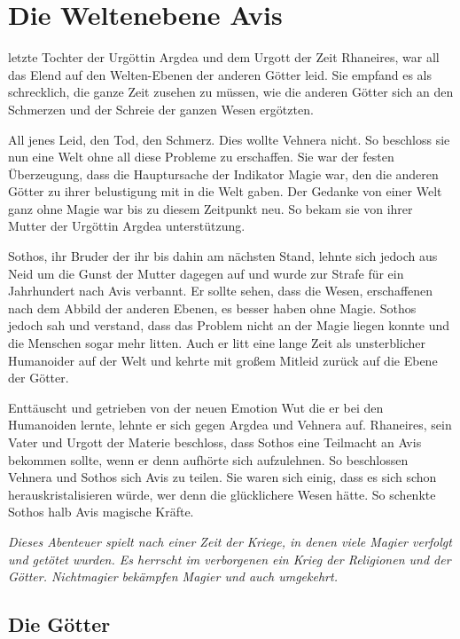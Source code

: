 \chapter{Die Weltenebene Avis}

 letzte Tochter der Urgöttin Argdea und dem Urgott der Zeit Rhaneires, war all das Elend auf den Welten-Ebenen der anderen Götter leid. Sie empfand es als schrecklich, die ganze Zeit zusehen zu müssen, wie die anderen Götter sich an den Schmerzen und der Schreie der ganzen Wesen ergötzten.

 All jenes Leid, den Tod, den Schmerz. Dies wollte Vehnera nicht. So beschloss sie nun eine Welt ohne all diese Probleme zu erschaffen. Sie war der festen Überzeugung, dass die Hauptursache der Indikator Magie war, den die anderen Götter zu ihrer belustigung mit in die Welt gaben. Der Gedanke von einer Welt ganz ohne Magie war bis zu diesem Zeitpunkt neu. So bekam sie von ihrer Mutter der Urgöttin Argdea unterstützung.

Sothos, ihr Bruder der ihr bis dahin am nächsten Stand, lehnte sich jedoch aus Neid um die Gunst der Mutter dagegen auf und wurde zur Strafe für ein Jahrhundert nach Avis verbannt. Er sollte sehen, dass die Wesen, erschaffenen nach dem Abbild der anderen Ebenen, es besser haben ohne Magie. Sothos jedoch sah und verstand, dass das Problem nicht an der Magie liegen konnte und die Menschen sogar mehr litten. Auch er litt eine lange Zeit als unsterblicher Humanoider auf der Welt und kehrte mit großem Mitleid zurück auf die Ebene der Götter.

Enttäuscht und getrieben von der neuen Emotion Wut die er bei den Humanoiden lernte, lehnte er sich gegen Argdea und Vehnera auf. Rhaneires, sein Vater und Urgott der Materie beschloss, dass Sothos eine Teilmacht an Avis bekommen sollte, wenn er denn aufhörte sich aufzulehnen. So beschlossen Vehnera und Sothos sich Avis zu teilen. Sie waren sich einig, dass es sich schon herauskristalisieren würde, wer denn die glücklichere Wesen hätte. So schenkte Sothos halb Avis magische Kräfte.

\textit{Dieses Abenteuer spielt nach einer Zeit der Kriege, in denen viele Magier verfolgt und getötet wurden. Es herrscht im verborgenen ein Krieg der Religionen und der Götter. Nichtmagier bekämpfen Magier und auch umgekehrt.}

\section{Die Götter}
